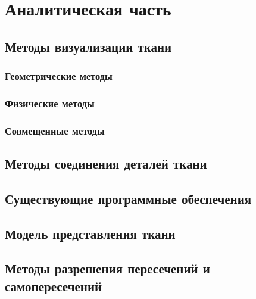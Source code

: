 \chapter{Аналитическая часть}

\section{Методы визуализации ткани}

\subsection{Геометрические методы}
\subsection{Физические методы}
\subsection{Совмещенные методы}

\section{Методы соединения деталей ткани}

\section{Существующие программные обеспечения}

\section{Модель представления ткани}
\section{Методы разрешения пересечений и самопересечений}
